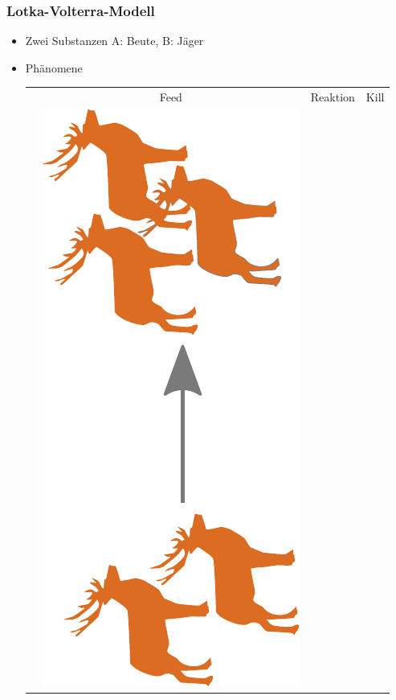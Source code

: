 \documentclass[12pt]{beamer}
\begin{document}
    \begin{frame}
      \frametitle{Lotka-Volterra-Modell}
      \begin{itemize}
      \item Zwei Substanzen A: Beute, B: Jäger
      \item Phänomene
      \begin{tabular}{ r c c c }
	  & Feed & Reaktion & Kill \\
	  &
      \includegraphics[scale=0.15,angle=-90,origin=c]{Bilder/lv_feed.pdf}
	  &

\end{tabular}
\end{itemize}
\end{frame}
\end{document}
